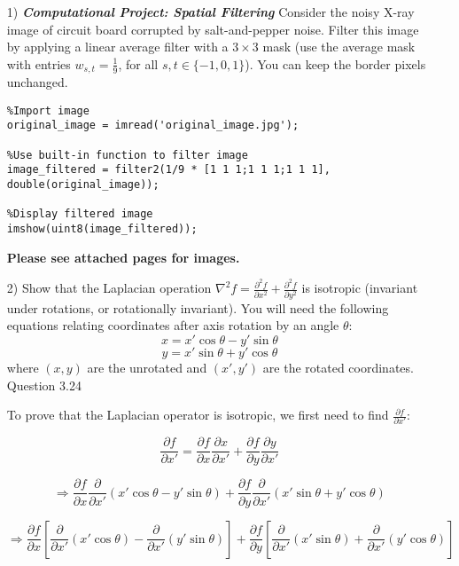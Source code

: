 \documentclass{article}
\begin{document}
\begin{enumerate}

\item[1)] \textbf{\textit{Computational Project: Spatial Filtering}} \newline
Consider the noisy X-ray image of circuit board corrupted by salt-and-pepper noise. Filter this image by applying a linear average filter 
with a $3\times 3$ mask (use the average mask with entries $w_{s,t}=\frac{1}{9}$, for all $s,t\in \{-1,0,1\}$). You can keep the border pixels unchanged.

\begin{lstlisting}
%Import image
original_image = imread('original_image.jpg');

%Use built-in function to filter image
image_filtered = filter2(1/9 * [1 1 1;1 1 1;1 1 1], double(original_image));

%Display filtered image
imshow(uint8(image_filtered));
\end{lstlisting}

\textbf{Please see attached pages for images.}

\item[2)] Show that the Laplacian operation {\large$\nabla^2 f=\frac{\partial ^2f}{\partial x^2}+\frac{\partial ^2f}{\partial y^2}$} is isotropic 
(invariant under rotations, or rotationally invariant). You will need the following equations relating
coordinates after axis rotation by an angle $\theta$: 
$$x=x'\cos\theta-y'\sin\theta$$
$$y=x'\sin\theta+y'\cos\theta$$
where $(x,y)$ are the unrotated and $(x',y')$ are the rotated coordinates.
Question 3.24
\bigbreak

To prove that the Laplacian operator is isotropic, we first need to find {\Large$\frac{\partial f}{\partial x'}$}:

\begin{equation}
\frac{\partial f}{\partial x'} = \frac{\partial f}{\partial x}\frac{\partial x}{\partial x'} + \frac{\partial f}{\partial y}\frac{\partial y}{\partial x'}
\end{equation}

\begin{equation}
\Rightarrow \frac{\partial f}{\partial x}\frac{\partial}{\partial x'} (x'\cos\theta - y'\sin\theta) + \frac{\partial f}{\partial y}\frac{\partial}{\partial x'} (x'\sin\theta + y'\cos\theta)
\end{equation}

\begin{equation}
\Rightarrow \frac{\partial f}{\partial x} \left[ \frac{\partial}{\partial x'} (x'\cos\theta) - \frac{\partial}{\partial x'} (y'\sin\theta) \right] + \frac{\partial f}{\partial y} \left[ \frac{\partial }{\partial x'}(x'\sin\theta) + \frac{\partial}{\partial x'}(y'\cos\theta) \right]
\end{equation}


\end{enumerate}
\end{document}
